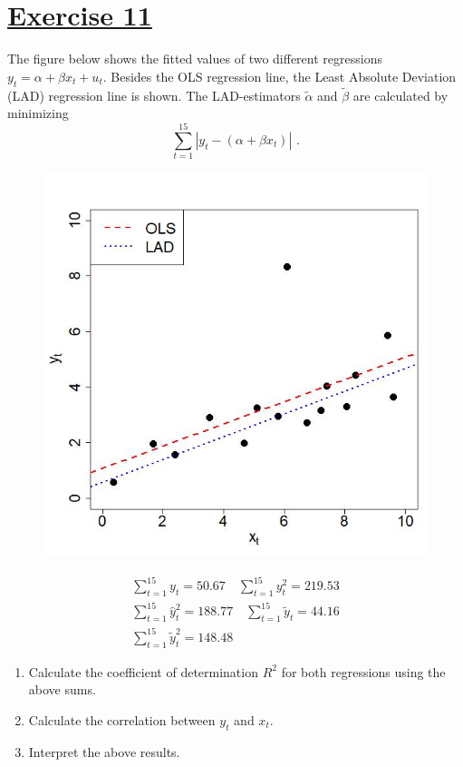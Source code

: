 \documentclass[captions=tableheading, 12pt, headings=small, parskip=half]{scrartcl}
\begin{document}
\section*{\underline{Exercise 11}}
The figure below shows the fitted values of two different regressions $y_t = \alpha + \beta x_t + u_t$. Besides the OLS regression line, the Least Absolute Deviation (LAD) regression line is shown. The LAD-estimators $\tilde{\alpha}$ and $\tilde{\beta}$ are calculated by minimizing
\[
\sum_{t = 1}^{15}{|y_t - (\alpha + \beta x_t)|}\text{ .}
\]
\begin{figure}[h!]
	\begin{minipage}{0.49\columnwidth}
		\includegraphics[width = \columnwidth]{Code1/LADreg.jpeg}
	\end{minipage}
	\hfill
	\begin{minipage}{0.49\columnwidth}
		\begin{align*}
		\sum_{t = 1}^{15}{y_t} = 50.67 \quad \sum_{t = 1}^{15}{y_t^2} = 219.53\\
		\sum_{t = 1}^{15}{\hat{y}_t^2} = 188.77 \quad \sum_{t = 1}^{15}{\tilde{y}_t} = 44.16\\
		\sum_{t = 1}^{15}{\tilde{y}_t^2} = 148.48
		\end{align*}
	\end{minipage}
\end{figure}
\begin{enumerate}[label = \alph*)]
	\item Calculate the coefficient of determination $R^2$ for both regressions using the above sums.
	\item Calculate the correlation between $y_t$ and $x_t$.
	\item Interpret the above results.
\end{enumerate}
\end{document}
